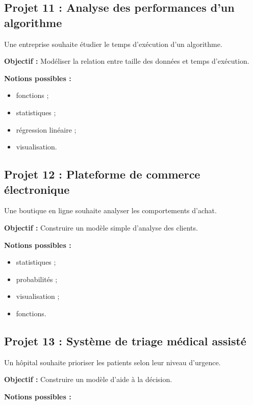 \documentclass[12pt,a4paper]{article}
\begin{document}
\bigskip

\subsection*{Projet 11 : Analyse des performances d'un algorithme}

Une entreprise souhaite étudier le temps d'exécution d'un algorithme.

\textbf{Objectif :}
Modéliser la relation entre taille des données et temps d'exécution.

\textbf{Notions possibles :}

\begin{itemize}
\item fonctions ;
\item statistiques ;
\item régression linéaire ;
\item visualisation.
\end{itemize}

\bigskip

\subsection*{Projet 12 : Plateforme de commerce électronique}

Une boutique en ligne souhaite analyser les comportements d'achat.

\textbf{Objectif :}
Construire un modèle simple d'analyse des clients.

\textbf{Notions possibles :}

\begin{itemize}
\item statistiques ;
\item probabilités ;
\item visualisation ;
\item fonctions.
\end{itemize}

\bigskip

\subsection*{Projet 13 : Système de triage médical assisté}

Un hôpital souhaite prioriser les patients selon leur niveau d'urgence.

\textbf{Objectif :}
Construire un modèle d'aide à la décision.

\textbf{Notions possibles :}
\end{document}
